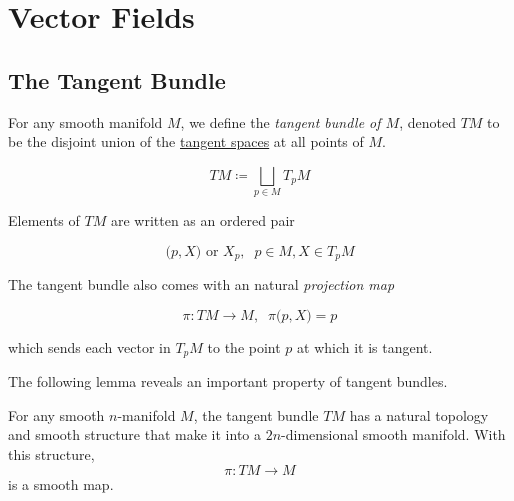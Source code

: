 \documentclass{article}
\newcounter{definition}[section]
\begin{document}
\section{Vector Fields}

  \subsection{The Tangent Bundle}

    \begin{definition}
      \label{def:tangent-bundle-of-m}
      For any smooth manifold $M$, we define the \textit{tangent bundle of $M$}, denoted $TM$ to be the disjoint union of the \hyperref[mv-def:tangent-space]{tangent spaces} at all points of $M$. 

        \begin{equation}
          TM \coloneqq \bigsqcup_{p \in M} T_p M
        \end{equation}

      Elements of $TM$ are written as an ordered pair 

        \begin{equation}
          \big(p, X \big) \text{ or } X_p, \;\; p \in M, X \in T_p M
        \end{equation}

      The tangent bundle also comes with an natural \textit{projection map}

        \begin{equation}
          \pi: TM \to M, \;\; \pi \big(p, X\big) = p
        \end{equation}

      which sends each vector in $T_p M$ to the point $p$ at which it is tangent. 
    \end{definition}

    The following lemma reveals an important property of tangent bundles. 

    \begin{lemma}
      \label{thm:smooth-structure-on-the-tangent-bundle}
      For any smooth $n$-manifold $M$, the tangent bundle $TM$ has a natural topology and smooth structure that make it into a $2n$-dimensional smooth manifold. With this structure, 
        \begin{equation}
          \pi: TM \to M
        \end{equation}
      is a smooth map. 
    \end{lemma}
\end{document}
